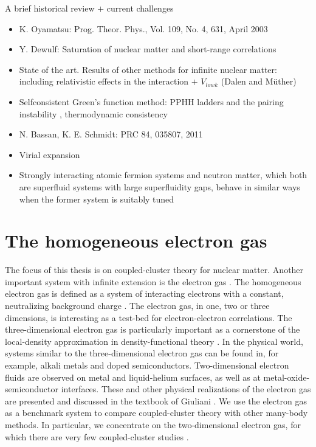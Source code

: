 \documentclass[a4paper,12pt]{report}
\begin{document}
A brief historical review $+$ current challenges
\begin{itemize}
\item K. Oyamatsu: Prog. Theor. Phys., Vol. 109, No. 4, 631, April 2003 
  \cite{oyamatsu2003}
\item Y. Dewulf: Saturation of nuclear matter and short-range correlations
\item State of the art. Results of other methods for infinite nuclear matter: including relativistic effects in the interaction $+$ $V_{lowk}$ (Dalen and M{\"u}ther) \cite{dalen2009}
\item Selfconsistent Green's function method: PPHH ladders and the pairing instability \cite{vonderfecht1993, alm1996, bozek1999}, thermodynamic consistency \cite{kadanoff1962, bozek2001}
\item N. Bassan, K. E. Schmidt: PRC 84, 035807, 2011
\item Virial expansion \cite{shen_2010}
\item Strongly interacting atomic fermion systems
  and neutron matter, which both are superfluid systems
  with large superfluidity gaps, behave in similar
  ways when the former system is suitably tuned 
  \cite{gezerlis_2008}
\end{itemize}


\section{The homogeneous electron gas}

The focus of this thesis is on coupled-cluster theory
for nuclear matter. Another important system with infinite 
extension is the electron gas \cite{giuliani2005}. 
The homogeneous electron gas is defined as a system of 
interacting electrons with a constant, neutralizing 
background charge \cite{fetter}. The electron gas, in one, 
two or three dimensions, is interesting as a test-bed for 
electron-electron correlations. The three-dimensional 
electron gas is particularly important as a cornerstone 
of the local-density approximation in density-functional 
theory \cite{gross1995}. In the physical world, systems 
similar to the three-dimensional electron gas can be 
found in, for example, alkali metals and doped 
semiconductors. Two-dimensional electron fluids are 
observed on metal and liquid-helium surfaces, as well as 
at metal-oxide-semiconductor interfaces. These and other 
physical realizations of the electron gas are presented and 
discussed in the textbook of Giuliani \cite{giuliani2005}.
We use the electron gas as a benchmark system
to compare coupled-cluster theory with other many-body 
methods. In particular, we concentrate on the two-dimensional
electron gas, for which there are very few coupled-cluster
studies \cite{freeman1978,freeman1983}.    
\end{document}
